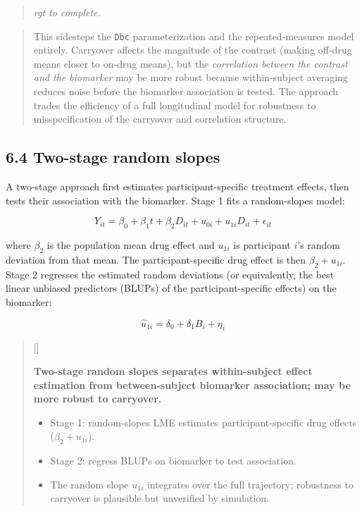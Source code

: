 \documentclass[
  11pt,
]{article}
\newcounter{pgraph}
\newenvironment{bullets}{%
  \stepcounter{pgraph}%
  \begin{quote}\small\sffamily\color[gray]{0.30}%
  {\normalfont\scriptsize\color[gray]{0.58}[\thepgraph]\enspace}}{%
  \end{quote}}
\newenvironment{rgt}{%
  \begin{quote}\small\itshape\color[RGB]{20,60,160}}{%
  \end{quote}}
\newenvironment{orig}{%
  \begin{quote}\normalsize\color[gray]{0.55}}{%
  \end{quote}}
\begin{document}
\begin{rgt}
rgt to complete.

\end{rgt}

\begin{orig}
This sidesteps the \texttt{Dbc} parameterization and the
repeated-measures model entirely. Carryover affects the magnitude of the
contrast (making off-drug means closer to on-drug means), but the
\textit{correlation between the contrast
and the biomarker} may be more robust because within-subject averaging
reduces noise before the biomarker association is tested. The approach
trades the efficiency of a full longitudinal model for robustness to
misspecification of the carryover and correlation structure.

\end{orig}

\subsection{6.4 Two-stage random slopes}

A two-stage approach first estimates participant-specific treatment
effects, then tests their association with the biomarker. Stage 1 fits a
random-slopes model:

\[Y_{it} = \beta_0 + \beta_1 t + \beta_2 D_{it} + u_{0i} +
u_{1i} D_{it} + \epsilon_{it}\]

where \(\beta_2\) is the population mean drug effect and \(u_{1i}\) is
participant \(i\)'s random deviation from that mean. The
participant-specific drug effect is then \(\beta_2 + u_{1i}\). Stage 2
regresses the estimated random deviations (or equivalently, the best
linear unbiased predictors (BLUPs) of the participant-specific effects)
on the biomarker:

\[\hat{u}_{1i} = \delta_0 + \delta_1 B_i + \eta_i\]

\begin{bullets}

\textbf{Two-stage random slopes separates within-subject effect
estimation from between-subject biomarker association; may be
more robust to carryover.}

\begin{itemize}\setlength{\itemsep}{2pt}\setlength{\parskip}{0pt}
\item Stage 1: random-slopes LME estimates participant-specific
  drug effects ($\beta_2 + u_{1i}$).
\item Stage 2: regress BLUPs on biomarker to test association.
\item The random slope $u_{1i}$ integrates over the full
  trajectory; robustness to carryover is plausible but
  unverified by simulation.
\end{itemize}

\end{bullets}
\end{document}
